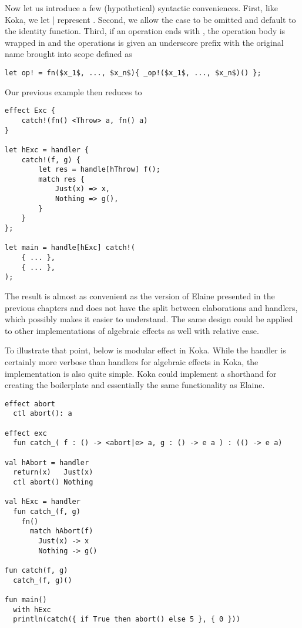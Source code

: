 Now let us introduce a few (hypothetical) syntactic conveniences. First, like Koka, we let | represent . Second, we allow the  case to be omitted and default to the identity function. Third, if an operation ends with \el{!}, the operation body is wrapped in  and the operations is given an underscore prefix with the original name brought into scope defined as

\begin{lstlisting}[language=elaine,style=fancy]
let op! = fn($x_1$, ..., $x_n$){ _op!($x_1$, ..., $x_n$)() };
\end{lstlisting}

Our previous example then reduces to

\begin{lstlisting}[language=elaine,style=fancy]
effect Exc {
    catch!(fn() <Throw> a, fn() a)
}

let hExc = handler {
    catch!(f, g) {
        let res = handle[hThrow] f();
        match res {
            Just(x) => x,
            Nothing => g(),
        }
    }
};

let main = handle[hExc] catch!(
    { ... },
    { ... },
);
\end{lstlisting}

The result is almost as convenient as the version of Elaine presented in the previous chapters and does not have the split between elaborations and handlers, which possibly makes it easier to understand. The same design could be applied to other implementations of algebraic effects as well with relative ease.

To illustrate that point, below is modular  effect in Koka. While the handler is certainly more verbose than handlers for algebraic effects in Koka, the implementation is also quite simple. Koka could implement a shorthand for creating the boilerplate and essentially the same functionality as Elaine.

\begin{lstlisting}[language={},style=fancy]
effect abort
  ctl abort(): a
  
effect exc
  fun catch_( f : () -> <abort|e> a, g : () -> e a ) : (() -> e a)
  
val hAbort = handler
  return(x)   Just(x)
  ctl abort() Nothing

val hExc = handler
  fun catch_(f, g)
    fn()
      match hAbort(f)
        Just(x) -> x
        Nothing -> g()

fun catch(f, g)
  catch_(f, g)()

fun main()
  with hExc
  println(catch({ if True then abort() else 5 }, { 0 }))
\end{lstlisting}

